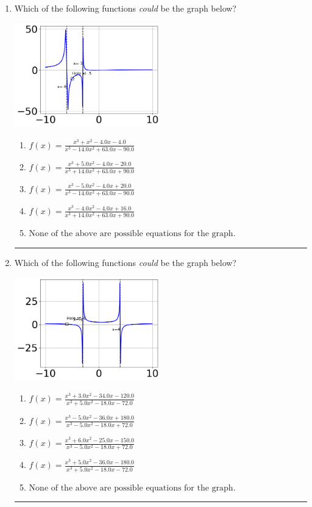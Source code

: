 \documentclass[14pt]{extbook}
\newcommand{\litem}[1]{\item#1\hspace*{-1cm}\rule{\textwidth}{0.4pt}}
\begin{document}
\begin{enumerate}
{\begin{enumerate}[label=\Alph*.]
\end{enumerate} }
\litem{
Which of the following functions \textit{could} be the graph below?
\begin{center}
    \includegraphics[width=0.5\textwidth]{../Figures/identifyGraphOfRationalFunctionCopyB.png}
\end{center}
\begin{enumerate}[label=\Alph*.]
\item \( f(x)=\frac{x^{3} + x^{2} -4.0 x -4.0}{x^{3} -14.0 x^{2} +63.0 x -90.0} \)
\item \( f(x)=\frac{x^{3} +5.0 x^{2} -4.0 x -20.0}{x^{3} +14.0 x^{2} +63.0 x + 90.0} \)
\item \( f(x)=\frac{x^{3} -5.0 x^{2} -4.0 x + 20.0}{x^{3} -14.0 x^{2} +63.0 x -90.0} \)
\item \( f(x)=\frac{x^{3} -4.0 x^{2} -4.0 x + 16.0}{x^{3} +14.0 x^{2} +63.0 x + 90.0} \)
\item \( \text{None of the above are possible equations for the graph.} \)

\end{enumerate} }
\litem{
Which of the following functions \textit{could} be the graph below?
\begin{center}
    \includegraphics[width=0.5\textwidth]{../Figures/identifyGraphOfRationalFunctionB.png}
\end{center}
\begin{enumerate}[label=\Alph*.]
\item \( f(x)=\frac{x^{3} +3.0 x^{2} -34.0 x -120.0}{x^{3} +5.0 x^{2} -18.0 x -72.0} \)
\item \( f(x)=\frac{x^{3} -5.0 x^{2} -36.0 x + 180.0}{x^{3} -5.0 x^{2} -18.0 x + 72.0} \)
\item \( f(x)=\frac{x^{3} +6.0 x^{2} -25.0 x -150.0}{x^{3} -5.0 x^{2} -18.0 x + 72.0} \)
\item \( f(x)=\frac{x^{3} +5.0 x^{2} -36.0 x -180.0}{x^{3} +5.0 x^{2} -18.0 x -72.0} \)
\item \( \text{None of the above are possible equations for the graph.} \)


\end{enumerate}}
\end{enumerate}
\end{document}
